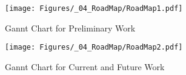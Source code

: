 \begin{figure}[ht!]
    \centering
    \texttt{[image: Figures/\_04\_RoadMap/RoadMap1.pdf]}
	\caption{\label{fig:RoadMap1} Gannt Chart for Preliminary Work}
 \end{figure}



\begin{figure}[ht!]
    \centering
    \texttt{[image: Figures/\_04\_RoadMap/RoadMap2.pdf]}
	\caption{\label{fig:RoadMap2} Gannt Chart for Current and Future Work}
 \end{figure}

